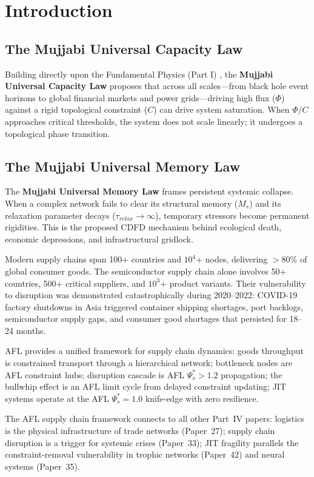 \documentclass[11pt]{article}
\begin{document}
\section{Introduction}


\subsection{The Mujjabi Universal Capacity Law}
Building directly upon the Fundamental Physics (Part I) \cite{MujjabiPartI2026}, the \textbf{Mujjabi Universal Capacity Law} proposes that across all scales---from black hole event horizons to global financial markets and power grids---driving high flux ($\Phi$) against a rigid topological constraint ($C$) can drive system saturation. When $\Phi/C$ approaches critical thresholds, the system does not scale linearly; it undergoes a topological phase transition.

\subsection{The Mujjabi Universal Memory Law}
The \textbf{Mujjabi Universal Memory Law} frames persistent systemic collapse. When a complex network fails to clear its structural memory ($M_s$) and its relaxation parameter decays ($\tau_{relax} \to \infty$), temporary stressors become permanent rigidities. This is the proposed CDFD mechanism behind ecological death, economic depressions, and infrastructural gridlock.


Modern supply chains span 100+ countries and $10^4$+ nodes, delivering $>$80\% of global
consumer goods. The semiconductor supply chain alone involves 50+ countries, 500+ critical
suppliers, and $10^3$+ product variants. Their vulnerability to disruption was demonstrated
catastrophically during 2020--2022: COVID-19 factory shutdowns in Asia triggered container
shipping shortages, port backlogs, semiconductor supply gaps, and consumer good shortages
that persisted for 18--24 months.

AFL provides a unified framework for supply chain dynamics: goods throughput is constrained
transport through a hierarchical network; bottleneck nodes are AFL constraint hubs; disruption
cascade is AFL $\Psi_s^* > 1.2$ propagation; the bullwhip effect is an AFL limit cycle from delayed
constraint updating; JIT systems operate at the AFL $\Psi_s^* = 1.0$ knife-edge with zero resilience.

The AFL supply chain framework connects to all other Part~IV papers: logistics is the physical
infrastructure of trade networks (Paper~27); supply chain disruption is a trigger for systemic
crises (Paper~33); JIT fragility parallels the constraint-removal vulnerability in trophic
networks (Paper~42) and neural systems (Paper~35).
\end{document}
